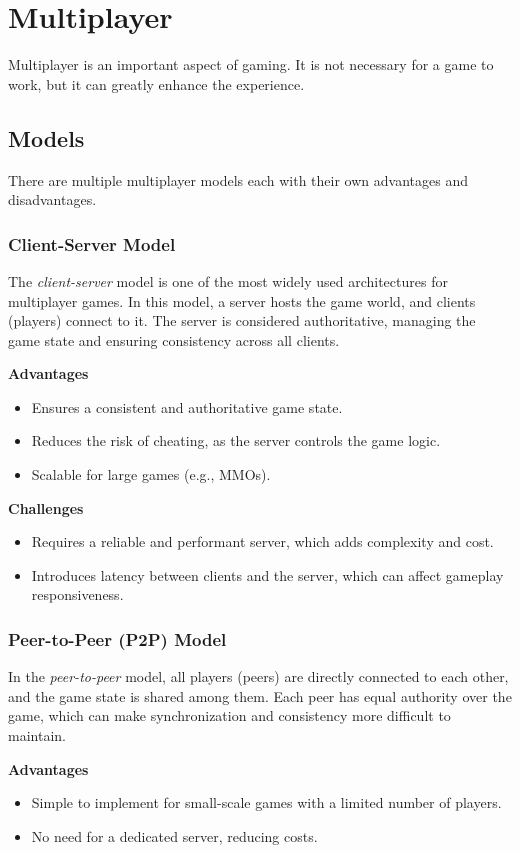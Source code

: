 \section{Multiplayer}
Multiplayer is an important aspect of gaming. It is not necessary for a game to work, but it can greatly enhance the experience.
\subsection{Models}
There are multiple multiplayer models each with their own advantages and disadvantages. \cite{Kroupp_2024}

\subsubsection{Client-Server Model}
The \textit{client-server} model is one of the most widely used architectures for multiplayer games. In this model, a server hosts the game world, and clients (players) connect to it. The server is considered authoritative, managing the game state and ensuring consistency across all clients.

\textbf{Advantages}
\begin{itemize}
    \item Ensures a consistent and authoritative game state.
    \item Reduces the risk of cheating, as the server controls the game logic.
    \item Scalable for large games (e.g., MMOs).
\end{itemize}

\textbf{Challenges}
\begin{itemize}
    \item Requires a reliable and performant server, which adds complexity and cost.
    \item Introduces latency between clients and the server, which can affect gameplay responsiveness.
\end{itemize}

\subsubsection{Peer-to-Peer (P2P) Model}
In the \textit{peer-to-peer} model, all players (peers) are directly connected to each other, and the game state is shared among them. Each peer has equal authority over the game, which can make synchronization and consistency more difficult to maintain.

\textbf{Advantages}
\begin{itemize}
    \item Simple to implement for small-scale games with a limited number of players.
    \item No need for a dedicated server, reducing costs.
\end{itemize}


